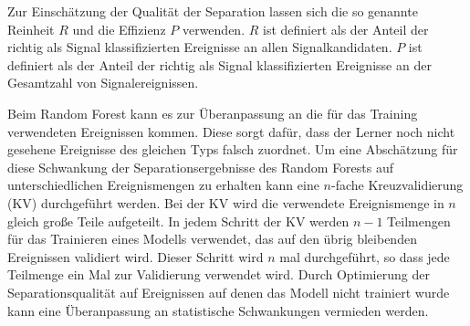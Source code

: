 Zur Einschätzung der Qualität der Separation lassen sich die so genannte Reinheit $R$ und die Effizienz $P$ verwenden.
$R$ ist definiert als der Anteil der richtig als Signal klassifizierten Ereignisse an allen Signalkandidaten. 
$P$ ist definiert als der Anteil der richtig als Signal klassifizierten Ereignisse an der Gesamtzahl von Signalereignissen.

Beim Random Forest kann es zur Überanpassung an die für das Training verwendeten Ereignissen kommen.
Diese sorgt dafür, dass der Lerner noch nicht gesehene Ereignisse des gleichen Typs falsch zuordnet.
Um eine Abschätzung für diese Schwankung der Separationsergebnisse des Random Forests auf unterschiedlichen Ereignismengen zu erhalten kann eine $n$-fache Kreuzvalidierung (KV) durchgeführt werden.
Bei der KV wird die verwendete Ereignismenge in $n$ gleich große Teile aufgeteilt. 
In jedem Schritt der KV werden $n-1$ Teilmengen für das Trainieren eines Modells verwendet, das auf den übrig bleibenden Ereignissen validiert wird.
Dieser Schritt wird $n$ mal durchgeführt, so dass jede Teilmenge ein Mal zur Validierung verwendet wird.
Durch Optimierung der Separationsqualität auf Ereignissen auf denen das Modell nicht trainiert wurde kann eine Überanpassung an statistische Schwankungen vermieden werden.
\cite{xvalKohavi}





